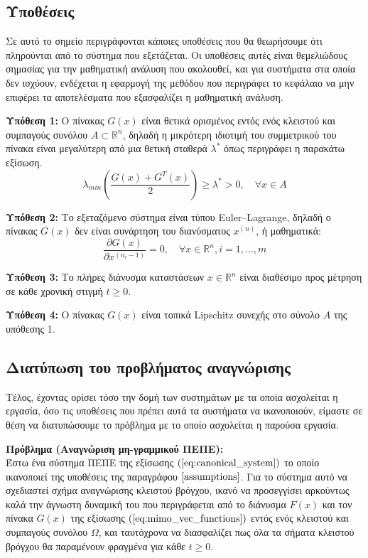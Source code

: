 \subsection{Υποθέσεις} \label{assumptions}
Σε αυτό το σημείο περιγράφονται κάποιες υποθέσεις που θα θεωρήσουμε ότι πληρούνται από το σύστημα που εξετάζεται. Οι υποθέσεις αυτές είναι θεμελιώδους σημασίας για την μαθηματική ανάλυση που ακολουθεί, και για συστήματα στα οποία δεν ισχύουν, ενδέχεται η εφαρμογή της μεθόδου που περιγράφει το κεφάλαιο να μην επιφέρει τα αποτελέσματα που εξασφαλίζει η μαθηματική ανάλυση.

\textbf{Υπόθεση 1:} Ο πίνακας $G(x)$ είναι θετικά ορισμένος εντός ενός κλειστού και συμπαγούς συνόλου $A \subset \mathbb{R}^n$, δηλαδή η μικρότερη ιδιοτιμή του συμμετρικού του πίνακα είναι μεγαλύτερη από μια θετική σταθερά $\lambda^*$ όπως περιγράφει η παρακάτω εξίσωση.
\begin{equation}
	\lambda_{min} \left(\frac{G(x) + G^T (x)}{2}\right) \geq \lambda^* > 0
	,\quad \forall x \in A
	\label{eq:assump_1}
\end{equation}

\textbf{Υπόθεση 2:} Το εξεταζόμενο σύστημα είναι τύπου Euler–Lagrange, δηλαδή ο πίνακας $G(x)$ δεν είναι συνάρτηση του διανύσματος $x^{(n)}$, ή μαθηματικά:
\begin{equation}
	\frac{\partial G(x)}{\partial x^{(n_i-1)}} = 0, \quad \forall x \in \mathbb{R}^n, i = 1,\dots,m
	\label{eq:assump_2}
\end{equation}

\textbf{Υπόθεση 3:} Το πλήρες διάνυσμα καταστάσεων $x \in \mathbb{R}^n$ είναι διαθέσιμο προς μέτρηση σε κάθε χρονική στιγμή $t \geq 0$.

\textbf{Υπόθεση 4:} Ο πίνακας $G(x)$ είναι τοπικά Lipschitz συνεχής στο σύνολο $A$ της υπόθεσης 1.

\subsection{Διατύπωση του προβλήματος αναγνώρισης} \label{subsec:problem_definition}
Τέλος, έχοντας ορίσει τόσο την δομή των συστημάτων με τα οποία ασχολείται η εργασία, όσο τις υποθέσεις που πρέπει αυτά τα συστήματα να ικανοποιούν, είμαστε σε θέση να διατυπώσουμε το πρόβλημα με το οποίο ασχολείται η παρούσα εργασία.

\textbf{Πρόβλημα (Αναγνώριση μη-γραμμικού ΠΕΠΕ):}\\
Έστω ένα σύστημα ΠΕΠΕ της εξίσωσης $(\ref{eq:canonical_system})$ το οποίο ικανοποιεί της υποθέσεις της παραγράφου $\ref{assumptions}$. Για το σύστημα αυτό να σχεδιαστεί σχήμα αναγνώρισης κλειστού βρόγχου, ικανό να προσεγγίσει αρκούντως καλά την άγνωστη δυναμική του που περιγράφεται από το διάνυσμα $F(x)$ και τον πίνακα $G(x)$ της εξίσωσης $(\ref{eq:mimo_vec_functions})$ εντός ενός κλειστού και συμπαγούς συνόλου $\Omega$, και ταυτόχρονα να διασφαλίζει πως όλα τα σήματα κλειστού βρόγχου θα παραμένουν φραγμένα για κάθε $t \geq 0$.

